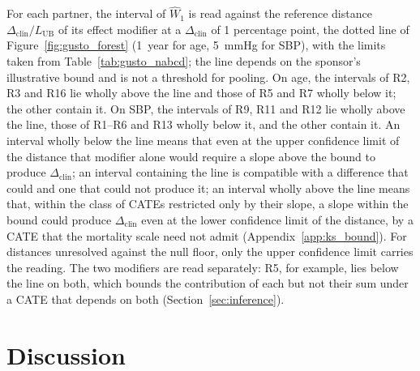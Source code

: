 \documentclass[AMA,Times1COL]{WileyNJDv5}
\begin{document}
For each partner, the interval of $\widehat{W}_1$ is read against the reference distance $\Delta_{\text{clin}} / L_{\text{UB}}$ of its effect modifier at a $\Delta_{\text{clin}}$ of 1 percentage point, the dotted line of Figure~\ref{fig:gusto_forest} (1~year for age, 5~mmHg for SBP), with the limits taken from Table~\ref{tab:gusto_nabcd}; the line depends on the sponsor's illustrative bound and is not a threshold for pooling. On age, the intervals of R2, R3 and R16 lie wholly above the line and those of R5 and R7 wholly below it; the other  contain it. On SBP, the intervals of R9, R11 and R12 lie wholly above the line, those of R1--R6 and R13 wholly below it, and the other  contain it. An interval wholly below the line means that even at the upper confidence limit of the distance that modifier alone would require a slope above the bound to produce $\Delta_{\text{clin}}$; an interval containing the line is compatible with a difference that could and one that could not produce it; an interval wholly above the line means that, within the class of CATEs restricted only by their slope, a slope within the bound could produce $\Delta_{\text{clin}}$ even at the lower confidence limit of the distance, by a CATE that the mortality scale need not admit (Appendix~\ref{app:ks_bound}). For distances unresolved against the null floor, only the upper confidence limit carries the reading. The two modifiers are read separately: R5, for example, lies below the line on both, which bounds the contribution of each but not their sum under a CATE that depends on both (Section~\ref{sec:inference}).

\section{Discussion}\label{sec:discussion}
\end{document}
